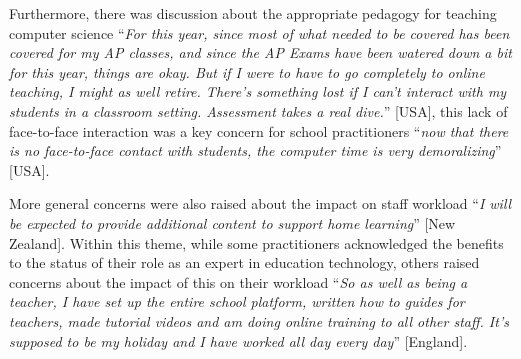 \documentclass[sigconf]{acmart}
\begin{document}
Furthermore, there was discussion about the appropriate pedagogy for
teaching computer science ``{\emph{For this year, since most of what
needed to be covered has been covered for my AP classes, and since the
AP Exams have been watered down a bit for this year, things are
okay. But if I were to have to go completely to online teaching, I
might as well retire. There's something lost if I can't interact with
my students in a classroom setting. Assessment takes a real dive.}}''
[USA], this lack of face-to-face interaction was a key concern for
school practitioners ``{\emph{now that there is no face-to-face
contact with students, the computer time is very demoralizing}}''
[USA].

More general concerns were also raised about the impact on staff
workload ``{\emph{I will be expected to provide additional content to
support home learning}}'' [New Zealand]. Within this theme, while some
practitioners acknowledged the benefits to the status of their role as
an expert in education technology, others raised concerns about the
impact of this on their workload ``{\emph{So as well as being a
teacher, I have set up the entire school platform, written how to
guides for teachers, made tutorial videos and am doing online training
to all other staff. It's supposed to be my holiday and I have worked
all day every day}}'' [England].

\end{document}
